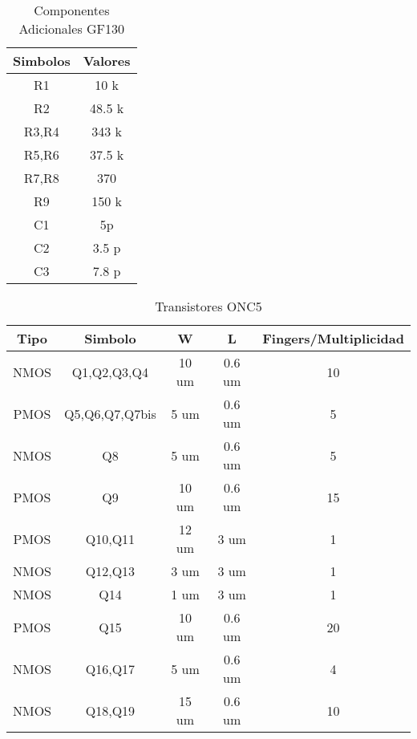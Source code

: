 \begin{table}[H]
\centering
\begin{tabular}{c|c}
\textbf{Simbolos} 	&	\textbf{Valores} \\ \hline
R1              	& 10 k           \\
R2              	& 48.5 k         \\
R3,R4           	& 343 k          \\
R5,R6           	& 37.5 k         \\
R7,R8           	& 370            \\
R9              	& 150 k           \\
C1              	& 5p             \\
C2              	& 3.5 p          \\
C3              	& 7.8 p          \\
\end{tabular}
\caption{Componentes Adicionales GF130}
\label{table:res_specs_130}
\end{table}

\begin{table}[H]
\centering
\begin{tabular}{c|c|c|c|c}
\textbf{Tipo}  		 & \textbf{Simbolo}	& \textbf{W}  & \textbf{L}  & \textbf{Fingers/Multiplicidad}  \\ \hline
NMOS                 & Q1,Q2,Q3,Q4    	& 10 um       & 0.6 um      & 10                \\
PMOS                 & Q5,Q6,Q7,Q7bis   & 5 um        & 0.6 um      & 5                 \\
NMOS                 & Q8             	& 5 um        & 0.6 um      & 5                 \\
PMOS                 & Q9             	& 10 um       & 0.6 um      & 15                \\
PMOS                 & Q10,Q11        	& 12 um       & 3 um        & 1                 \\
NMOS                 & Q12,Q13        	& 3 um        & 3 um        & 1                 \\
NMOS                 & Q14            	& 1 um        & 3 um        & 1                 \\
PMOS                 & Q15            	& 10 um       & 0.6 um      & 20                \\
NMOS                 & Q16,Q17        	& 5 um        & 0.6 um      & 4                 \\
NMOS                 & Q18,Q19        	& 15 um       & 0.6 um      & 10                \\
\end{tabular}
\caption{Transistores ONC5}
\label{table:trans_specs_500}
\end{table}

